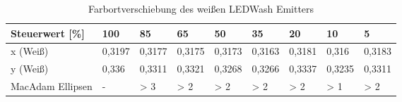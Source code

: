 \documentclass[11pt]{scrartcl}
\begin{document}
\noindent
\begin{table}[H]
    \begin{tabularx}{\textwidth}{|l|X|X|X|X|X|X|X|X|}
        \hline
        Steuerwert [\%]  & 100    & 85     & 65     & 50     & 35     & 20     & 10     & 5      \\\hline
        x (Weiß)         & 0,3197 & 0,3177 & 0,3175 & 0,3173 & 0,3163 & 0,3181 & 0,316  & 0,3183 \\\hline
        y (Weiß)         & 0,336  & 0,3311 & 0,3321 & 0,3268 & 0,3266 & 0,3337 & 0,3235 & 0,3311 \\\hline
        MacAdam Ellipsen & -      & > 3    & > 2    & > 2    & > 2    & > 2    & > 1    & > 2    \\\hline
    \end{tabularx}
    \caption{Farbortverschiebung des weißen LEDWash Emitters}
\end{table}
\noindent
\clearpage
\end{document}

